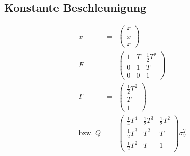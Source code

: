 \subsection{Konstante Beschleunigung}
\begin{eqnarray*}
    x &=& \begin{pmatrix} x \\ \dot{x} \\ \ddot{x} \end{pmatrix} \\
    F &=& \begin{pmatrix} 1 & T & \frac{1}{2} T^2 \\ 0 & 1 & T \\ 0 & 0 & 1 \end{pmatrix} \\
    \Gamma &=& \begin{pmatrix} \frac{1}{2} T^2 \\ T \\ 1 \end{pmatrix} \\
    \text{bzw. } Q &=& 
        \begin{pmatrix} 
            \frac{1}{4} T^4 & \frac{1}{2} T^3 & \frac{1}{2} T^2 \\ 
            \frac{1}{2} T^3 & T^2 & T \\
            \frac{1}{2} T^2 & T & 1 
        \end{pmatrix}
        \sigma^2_v \\
\end{eqnarray*}
